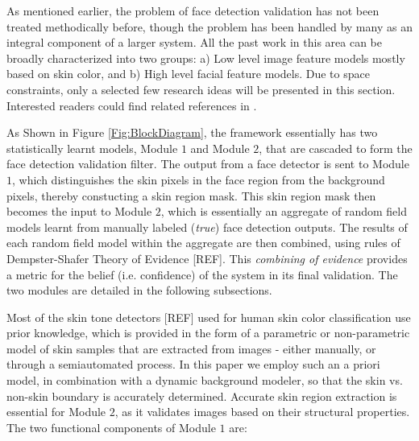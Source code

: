 \documentclass[times, 10pt,twocolumn]{article}
\begin{document}
\label{RelatedWork} As mentioned earlier, the
problem of face detection validation has not been treated
methodically before, though the problem has been handled by many as
an integral component of a larger system. All the past work in this
area can be broadly characterized into two groups: a) Low level
image feature models mostly based on skin color, and b) High level
facial feature models. Due to space constraints, only a selected few
research ideas will be presented in this section. Interested readers
could find related references in
\cite{ming-hsuan_yang_detecting_2002}.






\label{ProposedFramework} As Shown in
Figure \ref{Fig:BlockDiagram}, the framework essentially has two
statistically learnt models, Module $1$ and Module $2$, that are
cascaded to form the face detection validation filter. The output
from a face detector is sent to Module $1$, which distinguishes the
skin pixels in the face region from the background pixels, thereby
constucting a skin region mask. This skin region mask then becomes
the input to Module $2$, which is essentially an aggregate of random
field models learnt from manually labeled ({\it true}) face
detection outputs. The results of each random field model within the
aggregate are then combined, using rules of Dempster-Shafer Theory
of Evidence [REF]. This {\it combining of evidence} provides a
metric for the belief (i.e. confidence) of the system in its final
validation. The two modules are detailed in the following
subsections.
\label{Module1}

Most of the skin tone detectors [REF] used for human skin color
classification use prior knowledge, which is provided in the form of
a parametric or non-parametric model of skin samples that are
extracted from images - either manually, or through a semiautomated
process. In this paper we employ such an a priori model, in
combination with a dynamic background modeler, so that the skin vs.
non-skin boundary is accurately determined. Accurate skin region
extraction is essential for Module $2$, as it validates images based
on their structural properties. The two functional components of
Module $1$ are:
\end{document}
